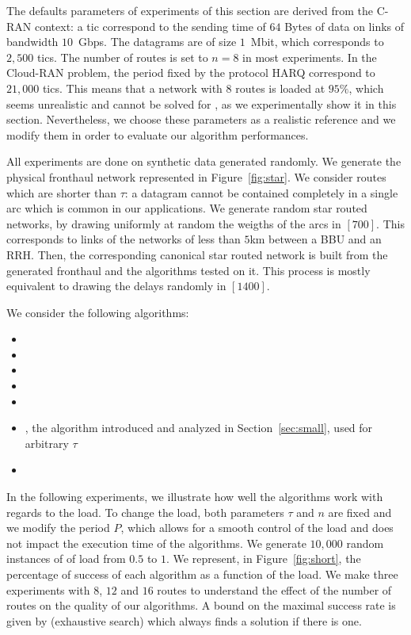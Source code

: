   The defaults parameters of experiments of this section are derived from the C-RAN context: a tic correspond to the sending time of $64$ Bytes of data on links of bandwidth $10$~Gbps. The datagrams are of size $1$~Mbit, which corresponds to $2,500$ tics. The number of routes is set to $n = 8$ in most experiments. In the Cloud-RAN problem, the period fixed by the protocol HARQ correspond to $21,000$ tics. This means that a network with $8$ routes is loaded at $95\%$, which seems unrealistic and cannot be solved for \pma, as we experimentally show it in this section. Nevertheless, we choose these parameters as a realistic reference and we modify them in order to evaluate our algorithm performances.


     All experiments are done on synthetic data generated randomly. We generate the physical fronthaul
     network represented in Figure~\ref{fig:star}. We consider routes which are shorter than $\tau$: a datagram cannot be contained completely in a single arc which is common in our applications. We generate random star routed networks, by drawing uniformly at random the weigths of the arcs in $[700]$. This corresponds to links of the networks of less than $5$km between a BBU and an RRH. Then, the corresponding canonical star routed network is built from the generated fronthaul and the algorithms tested on it. This process is mostly equivalent to drawing the delays randomly in $[1400]$.

     We consider the following algorithms:
\begin{itemize}
  \item \shortestlongest
  \item \firstfit
  \item \metaoffset
  \item \compactpair
  \item \compactfit
  \item \greedyuniform, the algorithm introduced and analyzed in Section~\ref{sec:small}, used for arbitrary $\tau$
  \item \exactresolution 
\end{itemize}


     In the following experiments, we illustrate how well the algorithms work with regards to the load. To change the load, both parameters $\tau$ and $n$ are fixed and we modify the period $P$, which allows for a smooth control of the load and does not impact the execution time of the algorithms.
	   We generate $10,000$ random instances of \pma of load from $0.5$ to $1$. We represent, in Figure~\ref{fig:short}, the percentage of success of each algorithm as a function of the load. We make three experiments with $8$, $12$ and $16$ routes to understand the effect of the number of routes on the quality of our algorithms. A bound on the maximal success rate is given by \ESCA (exhaustive search) which always finds a solution if there is one. 

